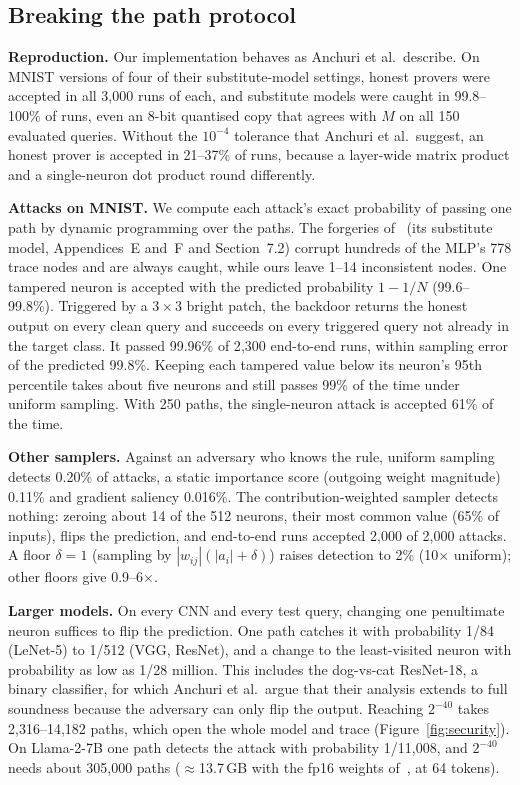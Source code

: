 \documentclass[sigconf,nonacm]{acmart}
\newcommand{\para}[1]{\par\noindent\textbf{#1}\quad}
\begin{document}
\subsection{Breaking the path protocol}
\label{sec:break}

\para{Reproduction.} Our implementation behaves as Anchuri et al.\ describe. On MNIST versions of
four of their substitute-model settings, honest provers were accepted in all 3{,}000 runs of each,
and substitute models were caught in 99.8--100\% of runs, even an 8-bit quantised copy that agrees
with $M$ on all 150 evaluated queries. Without the $10^{-4}$ tolerance that Anchuri et al.\ suggest, an honest prover is accepted in
21--37\% of runs, because a layer-wide matrix product and a single-neuron dot product round
differently.

\para{Attacks on MNIST.} We compute each attack's exact probability of passing one path by dynamic
programming over the paths. The forgeries of~\cite{anchuri2026verifiable} (its substitute model,
Appendices~E and~F and Section~7.2) corrupt hundreds of the MLP's 778 trace nodes and are always
caught, while ours leave 1--14 inconsistent nodes. One tampered neuron is accepted with the predicted probability $1-1/N$
(99.6--99.8\%). Triggered by a
$3{\times}3$ bright patch, the backdoor returns the honest output on every clean query and
succeeds on every triggered query not already in the target class. It passed 99.96\% of 2{,}300
end-to-end runs, within sampling error of the predicted 99.8\%. Keeping each tampered value below
its neuron's 95th percentile takes about five neurons and still passes 99\% of the time under
uniform sampling. With 250
paths, the single-neuron attack is accepted 61\% of the time.

\para{Other samplers.} Against an adversary who knows the rule, uniform sampling detects 0.20\%
of attacks, a static importance score (outgoing weight magnitude) 0.11\% and gradient saliency
0.016\%. The contribution-weighted sampler detects nothing: zeroing about 14 of the 512 neurons,
their most common value (65\% of inputs), flips the prediction, and end-to-end runs accepted
2{,}000 of 2{,}000 attacks. A floor
$\delta=1$ (sampling by $|w_{ij}|(|a_i|+\delta)$) raises detection to 2\% (10$\times$ uniform); other floors give 0.9--6$\times$.

\para{Larger models.} On every CNN and every test query, changing one penultimate neuron suffices
to flip the prediction. One path catches it with probability 1/84 (LeNet-5) to 1/512 (VGG,
ResNet), and a change to the least-visited neuron with probability as low as 1/28 million. This
includes the dog-vs-cat ResNet-18, a binary classifier, for which Anchuri et al.\ argue that their
analysis extends to full soundness because the adversary can only flip the output. Reaching $2^{-40}$ takes 2{,}316--14{,}182 paths, which open the whole model and trace
(Figure~\ref{fig:security}). On Llama-2-7B one path detects the attack with probability
1/11{,}008, and $2^{-40}$ needs about 305{,}000 paths ($\approx$13.7\,GB with the fp16 weights
of~\cite{anchuri2026verifiable}, at 64 tokens).
\end{document}
